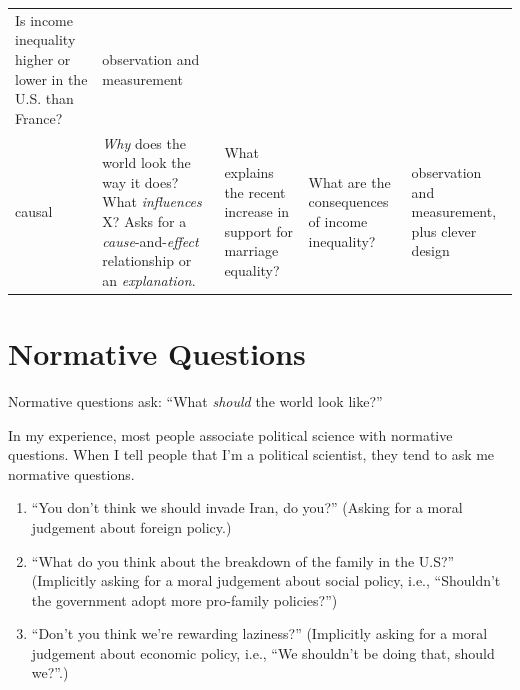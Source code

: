 \documentclass[]{book}
\providecommand{\tightlist}{%
  \setlength{\itemsep}{0pt}\setlength{\parskip}{0pt}}
\theoremstyle{definition}
\theoremstyle{definition}
\theoremstyle{definition}
\theoremstyle{remark}
\begin{document}
\begin{longtable}[]{@{}lllll@{}}
\begin{minipage}[t]{0.21\columnwidth}
Is income inequality higher or lower in the U.S. than France?\strut
\end{minipage} & \begin{minipage}[t]{0.12\columnwidth}\raggedright\strut
observation and measurement\strut
\end{minipage}\tabularnewline
\begin{minipage}[t]{0.17\columnwidth}\raggedright\strut
causal\strut
\end{minipage} & \begin{minipage}[t]{0.17\columnwidth}\raggedright\strut
\emph{Why} does the world look the way it does? What \emph{influences}
X? Asks for a \emph{cause}-and-\emph{effect} relationship or an
\emph{explanation}.\strut
\end{minipage} & \begin{minipage}[t]{0.14\columnwidth}\raggedright\strut
What explains the recent increase in support for marriage
equality?\strut
\end{minipage} & \begin{minipage}[t]{0.21\columnwidth}\raggedright\strut
What are the consequences of income inequality?\strut
\end{minipage} & \begin{minipage}[t]{0.12\columnwidth}\raggedright\strut
observation and measurement, plus clever design\strut
\end{minipage}\tabularnewline
\bottomrule
\end{longtable}

\section{Normative Questions}\label{normative-questions}

Normative questions ask: ``What \emph{should} the world look like?''

In my experience, most people associate political science with normative
questions. When I tell people that I'm a political scientist, they tend
to ask me normative questions.

\begin{enumerate}
\def\labelenumi{\arabic{enumi}.}
\tightlist
\item
  ``You don't think we should invade Iran, do you?'' (Asking for a moral
  judgement about foreign policy.)
\item
  ``What do you think about the breakdown of the family in the U.S?''
  (Implicitly asking for a moral judgement about social policy, i.e.,
  ``Shouldn't the government adopt more pro-family policies?'')
\item
  ``Don't you think we're rewarding laziness?'' (Implicitly asking for a
  moral judgement about economic policy, i.e., ``We shouldn't be doing
  that, should we?''.)
\end{enumerate}
\end{document}
